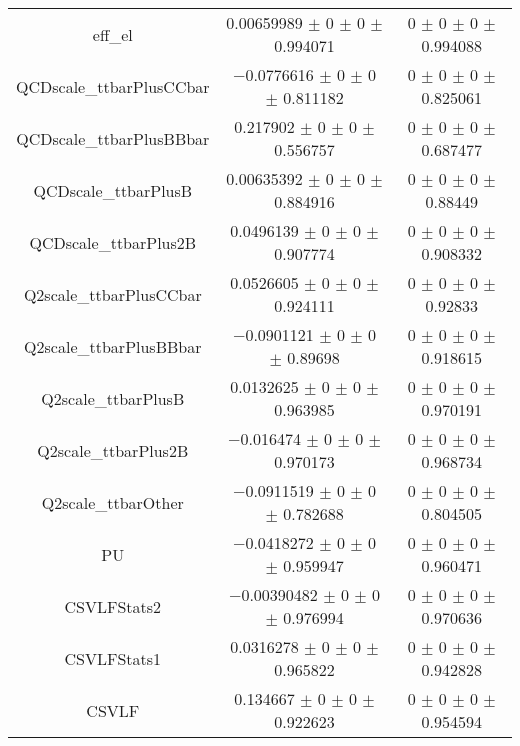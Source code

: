 \begin{table}
\begin{tabular}{ccc}
eff\_el 	& \num{0.00659989} $\pm$ \num{0} $\pm$ \num{0} $\pm$ \num{0.994071} 	& \num{0} $\pm$ \num{0} $\pm$ \num{0} $\pm$ \num{0.994088}\\
QCDscale\_ttbarPlusCCbar 	& \num{-0.0776616} $\pm$ \num{0} $\pm$ \num{0} $\pm$ \num{0.811182} 	& \num{0} $\pm$ \num{0} $\pm$ \num{0} $\pm$ \num{0.825061}\\
QCDscale\_ttbarPlusBBbar 	& \num{0.217902} $\pm$ \num{0} $\pm$ \num{0} $\pm$ \num{0.556757} 	& \num{0} $\pm$ \num{0} $\pm$ \num{0} $\pm$ \num{0.687477}\\
QCDscale\_ttbarPlusB 	& \num{0.00635392} $\pm$ \num{0} $\pm$ \num{0} $\pm$ \num{0.884916} 	& \num{0} $\pm$ \num{0} $\pm$ \num{0} $\pm$ \num{0.88449}\\
QCDscale\_ttbarPlus2B 	& \num{0.0496139} $\pm$ \num{0} $\pm$ \num{0} $\pm$ \num{0.907774} 	& \num{0} $\pm$ \num{0} $\pm$ \num{0} $\pm$ \num{0.908332}\\
Q2scale\_ttbarPlusCCbar 	& \num{0.0526605} $\pm$ \num{0} $\pm$ \num{0} $\pm$ \num{0.924111} 	& \num{0} $\pm$ \num{0} $\pm$ \num{0} $\pm$ \num{0.92833}\\
Q2scale\_ttbarPlusBBbar 	& \num{-0.0901121} $\pm$ \num{0} $\pm$ \num{0} $\pm$ \num{0.89698} 	& \num{0} $\pm$ \num{0} $\pm$ \num{0} $\pm$ \num{0.918615}\\
Q2scale\_ttbarPlusB 	& \num{0.0132625} $\pm$ \num{0} $\pm$ \num{0} $\pm$ \num{0.963985} 	& \num{0} $\pm$ \num{0} $\pm$ \num{0} $\pm$ \num{0.970191}\\
Q2scale\_ttbarPlus2B 	& \num{-0.016474} $\pm$ \num{0} $\pm$ \num{0} $\pm$ \num{0.970173} 	& \num{0} $\pm$ \num{0} $\pm$ \num{0} $\pm$ \num{0.968734}\\
Q2scale\_ttbarOther 	& \num{-0.0911519} $\pm$ \num{0} $\pm$ \num{0} $\pm$ \num{0.782688} 	& \num{0} $\pm$ \num{0} $\pm$ \num{0} $\pm$ \num{0.804505}\\
PU 	& \num{-0.0418272} $\pm$ \num{0} $\pm$ \num{0} $\pm$ \num{0.959947} 	& \num{0} $\pm$ \num{0} $\pm$ \num{0} $\pm$ \num{0.960471}\\
CSVLFStats2 	& \num{-0.00390482} $\pm$ \num{0} $\pm$ \num{0} $\pm$ \num{0.976994} 	& \num{0} $\pm$ \num{0} $\pm$ \num{0} $\pm$ \num{0.970636}\\
CSVLFStats1 	& \num{0.0316278} $\pm$ \num{0} $\pm$ \num{0} $\pm$ \num{0.965822} 	& \num{0} $\pm$ \num{0} $\pm$ \num{0} $\pm$ \num{0.942828}\\
CSVLF 	& \num{0.134667} $\pm$ \num{0} $\pm$ \num{0} $\pm$ \num{0.922623} 	& \num{0} $\pm$ \num{0} $\pm$ \num{0} $\pm$ \num{0.954594}\\

\end{tabular}
\end{table}
